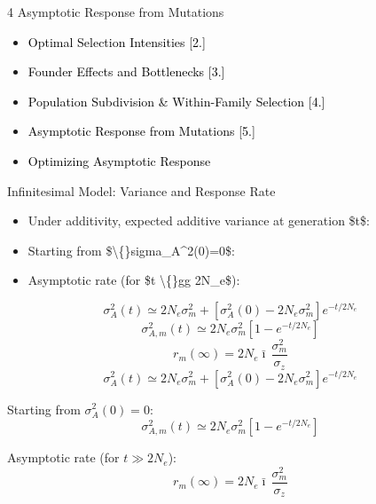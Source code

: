 \documentclass[10pt, aspectratio=169]{ctexbeamer}
\begin{document}
\begin{frame}{4 Asymptotic Response from Mutations}
  \vfill
  \begin{center}
    \begin{minipage}{0.7\textwidth}
      \begin{itemize}
        \setlength{\itemsep}{0.3\baselineskip}
        \item[\textcolor{black}{\textbf{1.}}] \textcolor{black}{Optimal Selection Intensities [2.]}
        \item[\textcolor{black}{\textbf{2.}}] \textcolor{black}{Founder Effects and Bottlenecks [3.]}
        \item[\textcolor{black}{\textbf{3.}}] \textcolor{black}{Population Subdivision \& Within-Family Selection [4.]}
        \item[\textcolor{black}{\textbf{4.}}] \textcolor{black}{Asymptotic Response from Mutations [5.]}
        \item[\textcolor{black}{\textbf{5.}}] \textcolor{black}{Optimizing Asymptotic Response}
      \end{itemize}
    \end{minipage}
  \end{center}
  \vfill
\end{frame}

\begin{frame}{Infinitesimal Model: Variance and Response Rate}
  \begin{itemize}
    \item Under additivity, expected additive variance at generation \$t\$:
    \item Starting from \$\textbackslash\{\}sigma\_A\textasciicircum{}2(0)=0\$:
    \item Asymptotic rate (for \$t \textbackslash\{\}gg 2N\_e\$):
  \end{itemize}
  \[
    \sigma_A^2(t) \simeq 2N_e\sigma_m^2 + [\sigma_A^2(0)-2N_e\sigma_m^2]e^{-t/2N_e} \tag{26.27}
  \]
  \[
    \sigma_{A,m}^2(t) \simeq 2N_e\sigma_m^2[1-e^{-t/2N_e}] \tag{26.28a}
  \]
  \[
    r_m(\infty) = 2N_e\bar{\imath}\,\frac{\sigma_m^2}{\sigma_z} \tag{26.29}
  \]
  \[
    \sigma_A^2(t) \simeq 2N_e\sigma_m^2 + [\sigma_A^2(0)-2N_e\sigma_m^2]e^{-t/2N_e} \tag{26.27} \] \item<2-> Starting from $\sigma_A^2(0)=0$: \[ \sigma_{A,m}^2(t) \simeq 2N_e\sigma_m^2[1-e^{-t/2N_e}] \tag{26.28a} \] \item<3-> Asymptotic rate (for $t \gg 2N_e$): \[ r_m(\infty) = 2N_e\bar{\imath}\,\frac{\sigma_m^2}{\sigma_z} \tag{26.29} \]
  \]
\end{frame}
\end{document}
